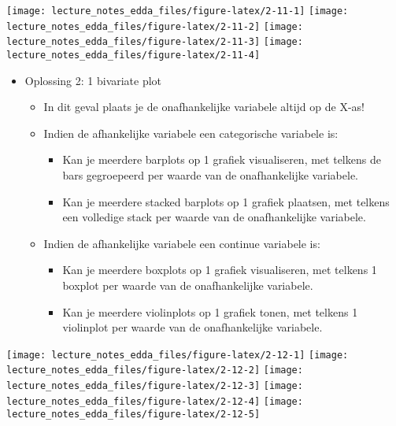 \documentclass[]{memoir}
\providecommand{\tightlist}{%
  \setlength{\itemsep}{0pt}\setlength{\parskip}{0pt}}
\begin{document}
\texttt{[image: lecture\_notes\_edda\_files/figure-latex/2-11-1]}
\texttt{[image: lecture\_notes\_edda\_files/figure-latex/2-11-2]}
\texttt{[image: lecture\_notes\_edda\_files/figure-latex/2-11-3]}
\texttt{[image: lecture\_notes\_edda\_files/figure-latex/2-11-4]}

\begin{itemize}
\tightlist
\item
  Oplossing 2: 1 bivariate plot

  \begin{itemize}
  \tightlist
  \item
    In dit geval plaats je de onafhankelijke variabele altijd op de
    X-as!
  \item
    Indien de afhankelijke variabele een categorische variabele is:

    \begin{itemize}
    \tightlist
    \item
      Kan je meerdere barplots op 1 grafiek visualiseren, met telkens de
      bars gegroepeerd per waarde van de onafhankelijke variabele.
    \item
      Kan je meerdere stacked barplots op 1 grafiek plaatsen, met
      telkens een volledige stack per waarde van de onafhankelijke
      variabele.
    \end{itemize}
  \item
    Indien de afhankelijke variabele een continue variabele is:

    \begin{itemize}
    \tightlist
    \item
      Kan je meerdere boxplots op 1 grafiek visualiseren, met telkens 1
      boxplot per waarde van de onafhankelijke variabele.
    \item
      Kan je meerdere violinplots op 1 grafiek tonen, met telkens 1
      violinplot per waarde van de onafhankelijke variabele.
    \end{itemize}
  \end{itemize}
\end{itemize}

\texttt{[image: lecture\_notes\_edda\_files/figure-latex/2-12-1]}
\texttt{[image: lecture\_notes\_edda\_files/figure-latex/2-12-2]}
\texttt{[image: lecture\_notes\_edda\_files/figure-latex/2-12-3]}
\texttt{[image: lecture\_notes\_edda\_files/figure-latex/2-12-4]}
\texttt{[image: lecture\_notes\_edda\_files/figure-latex/2-12-5]}
\end{document}
